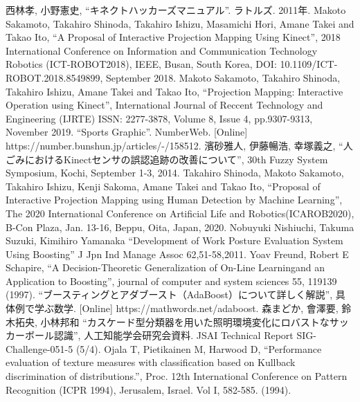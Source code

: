\begin{thebibliography}{99}
 西林孝, 小野憲史, ``キネクトハッカーズマニュアル''. ラトルズ. 2011年.
 Makoto Sakamoto, Takahiro Shinoda, Takahiro Ishizu, Masamichi Hori, Amane Takei and  Takao Ito, ``A Proposal of Interactive Projection Mapping Using Kinect'', 2018 International Conference on Information and Communication Technology Robotics (ICT-ROBOT2018), IEEE, Busan, South Korea, DOI: 10.1109/ICT-ROBOT.2018.8549899, September 2018.
 Makoto Sakamoto, Takahiro Shinoda, Takahiro Ishizu, Amane Takei and Takao Ito, ``Projection Mapping: Interactive Operation using Kinect'', International Journal of Reccent Technology and Engineering (IJRTE) ISSN: 2277-3878, Volume 8, Issue 4, pp.9307-9313, November 2019. 
 ``Sports Graphic''. NumberWeb. [Online] https://number.bunshun.jp/articles/-/158512.
 濱砂雅人, 伊藤暢浩, 幸塚義之, ``人ごみにおけるKinectセンサの誤認追跡の改善について'', 30th Fuzzy System Symposium, Kochi, September 1-3, 2014.
 Takahiro Shinoda, Makoto Sakamoto, Takahiro Ishizu,  Kenji Sakoma, Amane Takei and Takao Ito, ``Proposal of Interactive Projection Mapping using Human Detection by Machine Learning'', The 2020 International Conference on Artificial Life and Robotics(ICAROB2020), B-Con Plaza, Jan. 13-16, Beppu, Oita, Japan, 2020.
 Nobuyuki Nishiuchi, Takuma Suzuki, Kimihiro Yamanaka ``Development of Work Posture Evaluation System Using Boosting'' J Jpn Ind Manage Assoc 62,51-58,2011.
 Yoav Freund, Robert E Schapire, ``A Decision-Theoretic Generalization of On-Line Learningand an Application to Boosting'', journal of computer and system sciences 55, 119139 (1997).
 ``ブースティングとアダブースト（AdaBoost）について詳しく解説'', 具体例で学ぶ数学. [Online] https://mathwords.net/adaboost. 
 森まどか, 會澤要, 鈴木拓央, 小林邦和 ``カスケード型分類器を用いた照明環境変化にロバストなサッカーボール認識'', 人工知能学会研究会資料. JSAI Technical Report SIG-Challenge-051-5 (5/4).
 Ojala T, Pietikainen M, Harwood D, ``Performance evaluation of texture measures with classification based on Kullback discrimination of distributions.'', Proc. 12th International Conference on Pattern Recognition (ICPR 1994), Jerusalem, Israel. Vol I, 582-585. (1994).


\end{thebibliography}    